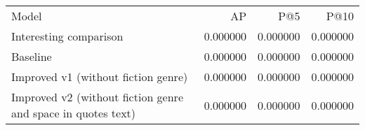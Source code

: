 \begin{tabular}{lrrr}
Model & AP & P@5 & P@10 \\
Interesting comparison & 0.000000 & 0.000000 & 0.000000 \\
Baseline & 0.000000 & 0.000000 & 0.000000 \\
Improved v1 (without fiction genre) & 0.000000 & 0.000000 & 0.000000 \\
Improved v2 (without fiction genre and space in quotes text) & 0.000000 & 0.000000 & 0.000000 \\
\end{tabular}
